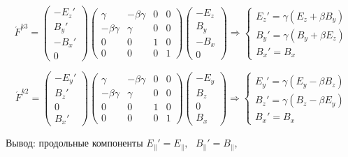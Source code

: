 \documentclass[12pt, a4paper]{report}
\begin{document}
\[ \acute{F } ^{k 3 } = \begin{pmatrix}
-E_z ' \\
B_y ' \\
- B_x ' \\
0
\end{pmatrix}
\begin{pmatrix}
    \gamma  & - \beta   \gamma & 0 & 0\\
    - \beta \gamma  & \gamma &0 & 0\\
    0 & 0 & 1 & 0\\
    0 & 0 & 0 & 1
\end{pmatrix} 
\begin{pmatrix}
    -E_z  \\
    B_y  \\
    - B_x  \\
    0
\end{pmatrix} \Rightarrow \begin{cases}
E_z ' = \gamma (E_z + \beta B_y )\\ 
B_y ' = \gamma(B_y +\beta E_z ) \\ 
B_x ' = B_x 
\end{cases}\]  

\[ \acute{F } ^{k 2 } = \begin{pmatrix}
-E_y ' \\
B_z ' \\
0 \\
B_x '
\end{pmatrix}
\begin{pmatrix}
    \gamma  & - \beta   \gamma & 0 & 0\\
    - \beta \gamma  & \gamma &0 & 0\\
    0 & 0 & 1 & 0\\
    0 & 0 & 0 & 1
\end{pmatrix} 
\begin{pmatrix}
    -E_y  \\
    B_z  \\
    0 \\
    B_x 
\end{pmatrix}\Rightarrow \begin{cases}
    E_y ' = \gamma (E_y - \beta B_z )\\ 
    B_z ' = \gamma(B_z -\beta E_y ) \\ 
    B_x ' = B_x 
    \end{cases}\] 

    Вывод: продольные компоненты \( E_{ \parallel } '  =E _{ \parallel }, \text{ }  B_{ \parallel }'  = B_{ \parallel }  \), 
    
\end{document}
